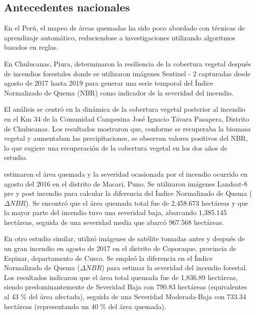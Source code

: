 \subsection{Antecedentes nacionales}
En el Perú, el mapeo de áreas quemadas ha sido poco abordado con técnicas de aprendizaje automático, reduciendose a investigaciones utilizando algoritmos basados en reglas. 

En Chulucanas, Piura, \citet{jimenez_dios_resiliencia_2020} 
determinaron la resiliencia de la cobertura vegetal después de incendios forestales donde se utilizaron imágenes Sentinel - 2 capturadas desde agosto de 2017 hasta 2019 para generar una serie temporal del Índice Normalizado de Quema (NBR) como indicador
de la severidad del incendio. 

El análisis se centró en la dinámica de la cobertura vegetal posterior al incendio en el Km 34 de la Comunidad Campesina José Ignacio Távara Pasapera, Distrito de Chulucanas. Los resultados mostraron que, conforme se recuperaba
la biomasa vegetal y aumentaban las precipitaciones, se observan valores positivos del NBR, lo que sugiere una recuperación de la cobertura vegetal en los dos años de estudio.

\citet{anamuro-luque_alisis_2020} estimaron el área quemada y la severidad ocasionada por el incendio ocurrido en agosto del 2016 en el distrito de Macari, Puno. Se utilizaron imágenes Landsat-8 pre y post incendio para calcular la diferencia del Índice
Normalizado de Quema ($\Delta NBR$). Se encontró que el área quemada total fue de 2,458.673 hectáreas y que la mayor parte del incendio tuvo una severidad baja, abarcando 1,385.145 hectáreas, seguida de una severidad media que abarcó 
967.568 hectáreas.

En otro estudio similar, \citet{gonzales_vasquez_aplicacion_2022} utilizó imágenes de satélite tomadas antes y después de un gran incendio en agosto de 2017 en el distrito de Coporaque, provincia de Espinar, departamento de Cusco. Se empleó la diferencia en el Índice Normalizado de Quema ($\Delta NBR$) 
para estimar la severidad del incendio forestal. Los resultados indicaron que el área total quemada fue de 1,836.89 hectáreas, siendo predominantemente de Severidad Baja con 790.83 hectáreas (equivalentes al 43 \% del área afectada), seguida de una Severidad Moderada-Baja con 
733.34 hectáreas (representando un 40 \% del área quemada).



